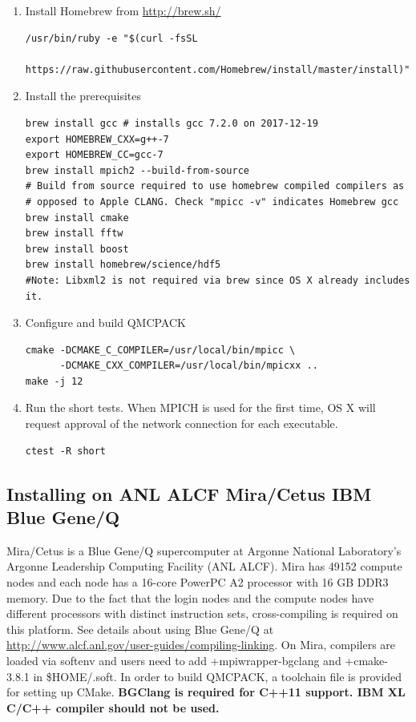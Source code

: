 \begin{enumerate}
\item Install Homebrew from \url{http://brew.sh/}
\verbatimfont{\footnotesize}%
\begin{verbatim}
/usr/bin/ruby -e "$(curl -fsSL
    https://raw.githubusercontent.com/Homebrew/install/master/install)"
\end{verbatim}

\item Install the prerequisites
\verbatimfont{\footnotesize}%
\begin{verbatim}
brew install gcc # installs gcc 7.2.0 on 2017-12-19
export HOMEBREW_CXX=g++-7
export HOMEBREW_CC=gcc-7
brew install mpich2 --build-from-source
# Build from source required to use homebrew compiled compilers as
# opposed to Apple CLANG. Check "mpicc -v" indicates Homebrew gcc
brew install cmake
brew install fftw
brew install boost
brew install homebrew/science/hdf5
#Note: Libxml2 is not required via brew since OS X already includes it.
\end{verbatim}
\item Configure and build QMCPACK
\verbatimfont{\footnotesize}%
\begin{verbatim}
cmake -DCMAKE_C_COMPILER=/usr/local/bin/mpicc \
      -DCMAKE_CXX_COMPILER=/usr/local/bin/mpicxx ..
make -j 12
\end{verbatim}
\item Run the short tests. When MPICH is used for the first time, OS
  X will request approval of the network connection for each executable.
\verbatimfont{\footnotesize}%
\begin{verbatim}
ctest -R short
\end{verbatim}
\end{enumerate}

\subsection{Installing on ANL ALCF Mira/Cetus IBM Blue Gene/Q}
\label{sec:buildbgq}
Mira/Cetus is a Blue Gene/Q supercomputer at Argonne National Laboratory's Argonne Leadership Computing Facility (ANL ALCF).
Mira has 49152 compute nodes and each node has a 16-core PowerPC A2 processor with 16 GB DDR3 memory.
Due to the fact that the login nodes and the compute nodes have different processors with distinct instruction sets,
cross-compiling is required on this platform. See details about using Blue Gene/Q at \url{http://www.alcf.anl.gov/user-guides/compiling-linking}.
On Mira, compilers are loaded via softenv and users need to add +mpiwrapper-bgclang and +cmake-3.8.1 in \$HOME/.soft.
In order to build QMCPACK, a toolchain file is provided for setting up CMake.
\textbf{BGClang is required for C++11 support. IBM XL C/C++ compiler should not be used.}

